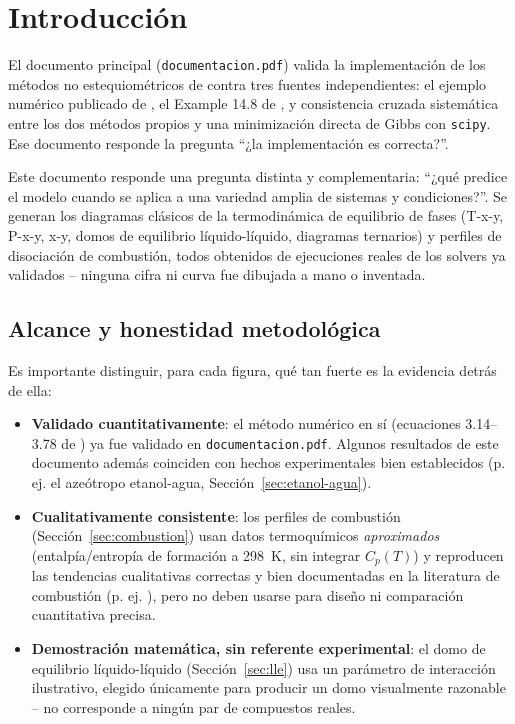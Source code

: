 \documentclass[11pt,a4paper]{article}
\begin{document}
\section{Introducción}

El documento principal (\texttt{documentacion.pdf}) valida la
implementación de los métodos no estequiométricos de
\citet{tsanas2018} contra tres fuentes independientes: el ejemplo
numérico publicado de \citet{greiner1991}, el Example 14.8 de
\citet{smithvannessabbott}, y consistencia cruzada sistemática entre
los dos métodos propios y una minimización directa de Gibbs con
\texttt{scipy}. Ese documento responde la pregunta ``¿la implementación
es correcta?''.

Este documento responde una pregunta distinta y complementaria: ``¿qué
predice el modelo cuando se aplica a una variedad amplia de sistemas y
condiciones?''. Se generan los diagramas clásicos de la termodinámica
de equilibrio de fases (T-x-y, P-x-y, x-y, domos de equilibrio
líquido-líquido, diagramas ternarios) y perfiles de disociación de
combustión, todos obtenidos de ejecuciones reales de los solvers ya
validados -- ninguna cifra ni curva fue dibujada a mano o inventada.

\subsection{Alcance y honestidad metodológica}

Es importante distinguir, para cada figura, qué tan fuerte es la
evidencia detrás de ella:

\begin{itemize}
  \item \textbf{Validado cuantitativamente}: el método numérico en sí
    (ecuaciones 3.14--3.78 de \citet{tsanas2018}) ya fue validado en
    \texttt{documentacion.pdf}. Algunos resultados de este documento
    además coinciden con hechos experimentales bien establecidos (p.
    ej. el azeótropo etanol-agua, Sección~\ref{sec:etanol-agua}).
  \item \textbf{Cualitativamente consistente}: los perfiles de
    combustión (Sección~\ref{sec:combustion}) usan datos termoquímicos
    \emph{aproximados} (entalpía/entropía de formación a 298~K, sin
    integrar $C_p(T)$) y reproducen las tendencias cualitativas
    correctas y bien documentadas en la literatura de combustión (p.
    ej. \citet{turns2012}), pero no deben usarse para diseño ni
    comparación cuantitativa precisa.
  \item \textbf{Demostración matemática, sin referente experimental}:
    el domo de equilibrio líquido-líquido (Sección~\ref{sec:lle}) usa
    un parámetro de interacción ilustrativo, elegido únicamente para
    producir un domo visualmente razonable -- no corresponde a ningún
    par de compuestos reales.
\end{itemize}
\end{document}
